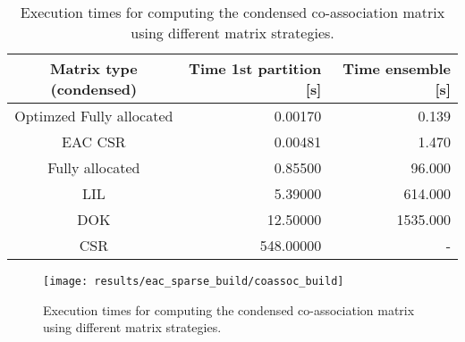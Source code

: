 \begin{table}[h]
\centering
 \caption{Execution times for computing the condensed co-association matrix using different matrix strategies.}
\begin{tabular}{crr}
\toprule
  Matrix type (condensed) &  Time 1st partition [s] &  Time ensemble [s] \\
\midrule
 Optimzed Fully allocated &                 0.00170 &              0.139 \\
                  EAC CSR &                 0.00481 &              1.470 \\
          Fully allocated &                 0.85500 &             96.000 \\
                      LIL &                 5.39000 &            614.000 \\
                      DOK &                12.50000 &           1535.000 \\
                      CSR &               548.00000 &                - \\
\bottomrule
\end{tabular}
\label{tab:coassoc build sparse}
\end{table}



\begin{figure}[hbtp]
\centering
\texttt{[image: results/eac\_sparse\_build/coassoc\_build]}
\caption{Execution times for computing the condensed co-association matrix using different matrix strategies.}
\label{fig:coassoc build sparse}
\end{figure}